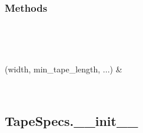 \documentclass[letterpaper,10pt,english]{sphinxmanual}
\begin{document}
\begin{fulllineitems}
\subsubsection*{Methods}


\begin{savenotes}\sphinxatlongtablestart\begin{longtable}[c]{}
\hline

\endfirsthead

%
{}\\
\hline

\endhead

\hline
{}\\
\endfoot

\endlastfoot

\sphinxAtStartPar
{\hyperref[\detokenize{generated/quality_assessment.data_types.TapeSpecs.__init__:quality_assessment.data_types.TapeSpecs.__init__}]{}}(width, min\_tape\_length, ...)
&
\sphinxAtStartPar

\\
\hline
\end{longtable}\sphinxatlongtableend\end{savenotes}


\subsection{TapeSpecs.\_\_init\_\_}
\label{\detokenize{generated/quality_assessment.data_types.TapeSpecs.__init__:tapespecs-init}}\label{\detokenize{generated/quality_assessment.data_types.TapeSpecs.__init__::doc}}


\end{fulllineitems}
\end{document}
